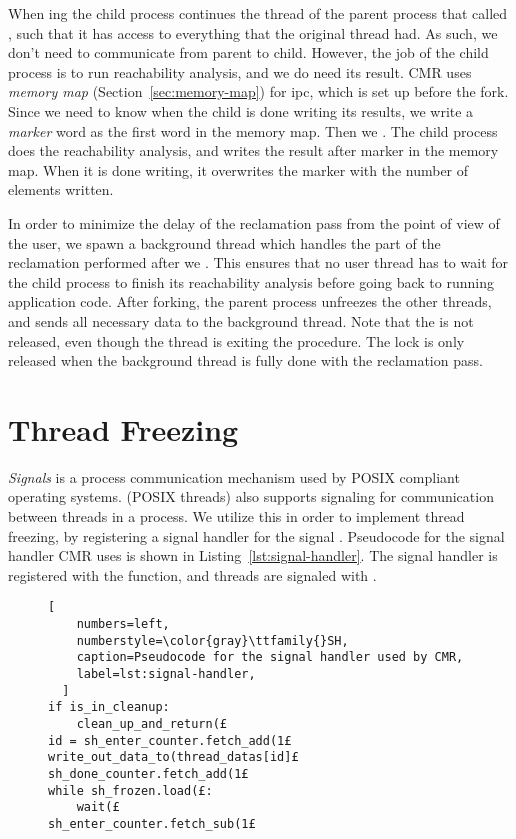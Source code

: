 When ing the child process continues the thread of the parent process that called
, such that it has access to everything that the original thread had.
As such, we don't need to communicate from parent to child. However, the job of the child process
is to run reachability analysis, and we do need its result. CMR uses \emph{memory map}
(Section~\ref{sec:memory-map}) for \gls{ipc}\@, which is set up before the fork. Since we need to
know when the child is done writing its results, we write a \emph{marker} word as the first word in
the memory map. Then we . The child process does the reachability analysis, and
writes the result after marker in the memory map. When it is done writing, it overwrites the marker
with the number of elements written.

In order to minimize the delay of the reclamation pass from the point of view of the user, we spawn
a background thread which handles the part of the reclamation performed after we .
This ensures that no user thread has to wait for the child process to finish its reachability
analysis before going back to running application code.  After forking, the parent process
unfreezes the other threads, and sends all necessary data to the background thread. Note that the
 is not released, even though the thread is exiting the procedure. The lock is
only released when the background thread is fully done with the reclamation pass.

\section{Thread Freezing\label{sec:signals}}

\emph{Signals} is a process communication mechanism used by POSIX compliant operating systems.
 (POSIX threads) also supports signaling for communication between threads in a
process. We utilize this in order to implement thread freezing, by registering a signal handler for
the signal . Pseudocode for the signal handler CMR uses is shown in
Listing~\ref{lst:signal-handler}. The signal handler is registered with the 
function, and threads are signaled with .

\begin{figure}[b]
  \begin{lstlisting}[
    numbers=left,
    numberstyle=\color{gray}\ttfamily{}SH,
    caption=Pseudocode for the signal handler used by CMR,
    label=lst:signal-handler,
  ]
if is_in_cleanup:
    clean_up_and_return(£
id = sh_enter_counter.fetch_add(1£
write_out_data_to(thread_datas[id]£
sh_done_counter.fetch_add(1£
while sh_frozen.load(£:
    wait(£
sh_enter_counter.fetch_sub(1£\end{lstlisting}
\end{figure}

